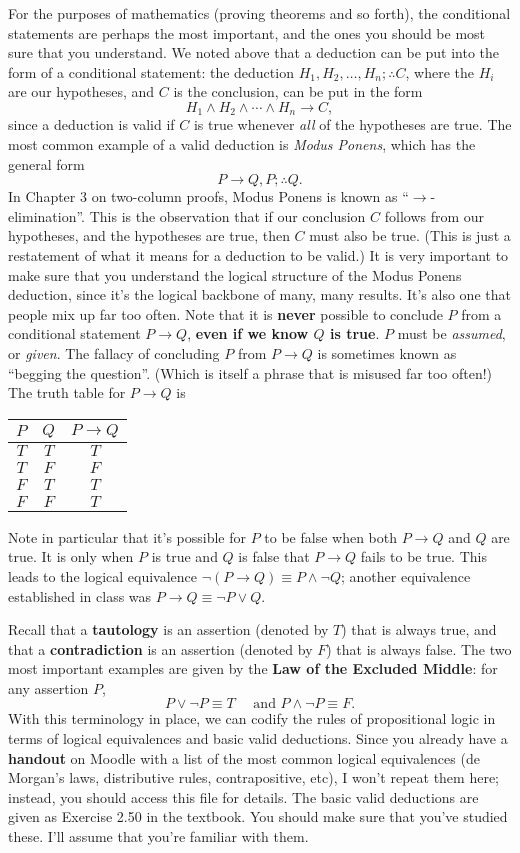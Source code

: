 \documentclass[letterpaper,12pt]{article}
\begin{document}
For the purposes of mathematics (proving theorems and so forth), the conditional statements are perhaps the most important, and the ones you should be most sure that you understand. We noted above that a deduction can be put into the form of a conditional statement: the deduction $H_1,H_2,\ldots, H_n;\therefore C$, where the $H_i$ are our hypotheses, and $C$ is the conclusion, can be put in the form
\[
 H_1\wedge H_2\wedge \cdots \wedge H_n \to C,
\]
since a deduction is valid if $C$ is true whenever {\em all} of the hypotheses are true. The most common example of a valid deduction is {\em Modus Ponens}, which has the general form
\[
 P\to Q, P; \therefore Q.
\]
In Chapter 3 on two-column proofs, Modus Ponens is known as ``$\to$-elimination''. This is the observation that if our conclusion $C$ follows from our hypotheses, and the hypotheses are true, then $C$ must also be true. (This is just a restatement of what it means for a deduction to be valid.) It is very important to make sure that you understand the logical structure of the Modus Ponens deduction, since it's the logical backbone of many, many results. It's also one that people mix up far too often. Note that it is {\bf never} possible to conclude $P$ from a conditional statement $P\to Q$, {\bf even if we know $Q$ is true}. $P$ must be {\em assumed}, or {\em given}. The fallacy of concluding $P$ from $P\to Q$ is sometimes known as ``begging the question''. (Which is itself a phrase that is misused far too often!) The truth table for $P\to Q$ is
\begin{center}
 \begin{tabular}{|c|c|c|}
  \hline
$P$ & $Q$ & $P\to Q$\\
\hline
$T$ & $T$ & $T$\\
$T$ & $F$ & $F$\\
$F$ & $T$ & $T$\\
$F$ & $F$ & $T$\\
\hline
 \end{tabular}
\end{center}
Note in particular that it's possible for $P$ to be false when both $P\to Q$ and $Q$ are true. It is only when $P$ is true and $Q$ is false that $P\to Q$ fails to be true. This leads to the logical equivalence $\neg (P\to Q) \equiv P\wedge \neg Q$; another equivalence established in class was $P\to Q\equiv \neg P\vee Q$. 

Recall that a {\bf tautology} is an assertion (denoted by $T$) that is always true, and that a {\bf contradiction} is an assertion (denoted by $F$) that is always false. The two most important examples are given by the {\bf Law of the Excluded Middle}: for any assertion $P$,
\[
 P\vee \neg P \equiv T\quad \text{ and } P\wedge \neg P \equiv F.
\]
With this terminology in place, we can codify the rules of propositional logic in terms of logical equivalences and basic valid deductions. Since you already have a {\bf handout} on Moodle with a list of the most common logical equivalences (de Morgan's laws, distributive rules, contrapositive, etc), I won't repeat them here; instead, you should access this file for details. The basic valid deductions are given as Exercise 2.50 in the textbook. You should make sure that you've studied these. I'll assume that you're familiar with them.
\end{document}

